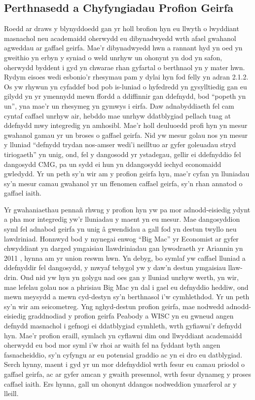 \subsection{Perthnasedd a Chyfyngiadau Profion Geirfa}
Roedd ar draws y blynyddoedd gan yr holl brofion hyn eu llwyth o lwyddiant masnachol neu academaidd oherwydd eu dibynadwyedd wrth afael gwahanol agweddau ar gaffael geirfa. Mae'r dibynadwyedd hwn a rannant hyd yn oed yn gweithio yn erbyn y syniad o weld unrhyw un ohonynt yn dod yn safon, oherwydd byddent i gyd yn chwarae rhan gyfartal o berthnaol yn y mater hwn. Rydym eisoes wedi esbonio'r rhesymau pam y dylai hyn fod felly yn adran 2.1.2. Os yw rhywun yn cyfaddef bod pob is-luniad o hyfedredd yn gysylltiedig gan eu gilydd yn yr ymennydd mewn ffordd a ddiffinnir gan ddefnydd, bod ``popeth yn un'', yna mae'r un rhesymeg yn gymwys i eirfa. Daw adnabyddiaeth fel cam cyntaf caffael unrhyw air, hebddo mae unrhyw ddatblygiad pellach tuag at ddefnydd mwy integredig yn amhosibl. Mae'r holl deuluoedd profi hyn yn mesur gwahanol gamau yr un broses o gaffael geirfa. Nid yw mesur golau nos yn mesur y lluniad ``defnydd trydan nos-amser wedi'i neilltuo ar gyfer goleuadau stryd tiriogaeth'' yn unig, ond, fel y dangosodd yr ystadegau, gellir ei ddefnyddio fel dangosydd CMG, pa un sydd ei hun yn ddangosydd iechyd economaidd gwledydd. Yr un peth sy'n wir am y profion geirfa hyn, mae'r cyfan yn lluniadau sy'n mesur camau gwahanol yr un ffenomen caffael geirfa, sy'n rhan annatod o gaffael iaith.

Yr gwahaniaethau pennañ rhwng y profion hyn yw pa mor adnodd-eisiedig ydynt a pha mor integredig yw'r lluniadau y maent yn eu mesur. Mae dangosyddion syml fel adnabod geirfa yn unig â gwendidau a gall fod yn destun twyllo neu lawdriniad. Honnwyd bod y mynegai enwog ``Big Mac'' yr Economist ar gyfer chwyddiant yn darged ymgaisiau llawdriniadau gan lywodraeth yr Ariannin yn 2011 \parencite{politi_argentinas_2011}, hynna am yr union reswm hwn. Yn debyg, bo symlaf yw caffael lluniad a ddefnyddir fel dangosydd, y mwyaf tebygol yw y daw'n destun ymgaisiau llaw-drin. Ond nid yw hyn yn golygu nad oes gan y lluniad unrhyw werth, yn wir, mae lefelau golau nos a phrisiau Big Mac yn dal i gael eu defnyddio heddiw, ond mewn meysydd a mewn cyd-destyn sy'n berthnasol i'w cymhlethdod. Yr un peth sy'n wir am seicometreg. Yng nghyd-destun profion geirfa, mae nodwedd adnodd-eisiedig graddnodiad y profion geirfa Peabody a WISC yn eu gwneud angen defnydd masnachol i gefnogi ei ddatblygiad cymhleth, wrth gyfiawni'r defnydd hyn. Mae'r profion eraill, symlach yn cyflawni dim ond llwyddiant academaidd oherwydd eu bod mor syml i'w rhoi ar waith fel na fyddant byth angen fasnacheiddio, sy'n cyfyngu ar eu potensial graddio ac yn ei dro eu datblygiad. Serch hynny, maent i gyd yr un mor ddefnyddiol wrth fesur eu camau priodol o gaffael geirfa, ac ar gyfer amcan y gwaith presennol, wrth fesur dynameg y proses caffael iaith. Ers hynna, gall un ohonynt ddangos nodweddion ymarferol ar y lleill.

